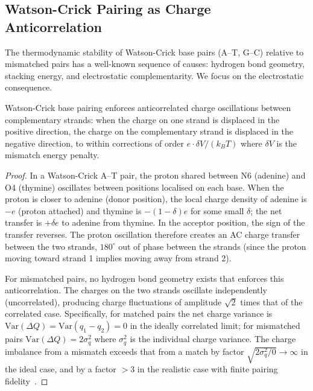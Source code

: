 \subsection{Watson-Crick Pairing as Charge Anticorrelation}

The thermodynamic stability of Watson-Crick base pairs (A--T, G--C) relative to mismatched pairs has a well-known sequence of causes: hydrogen bond geometry, stacking energy, and electrostatic complementarity. We focus on the electrostatic consequence.

\begin{theorem}
Watson-Crick base pairing enforces anticorrelated charge oscillations between complementary strands: when the charge on one strand is displaced in the positive direction, the charge on the complementary strand is displaced in the negative direction, to within corrections of order $e \cdot \delta V / (k_B T)$ where $\delta V$ is the mismatch energy penalty.
\label{v:thm:charge_balance}
\end{theorem}

\begin{proof}
In a Watson-Crick A--T pair, the proton shared between N6 (adenine) and O4 (thymine) oscillates between positions localised on each base. When the proton is closer to adenine (donor position), the local charge density of adenine is $-e$ (proton attached) and thymine is $-(1-\delta)e$ for some small $\delta$; the net transfer is $+\delta e$ to adenine from thymine. In the acceptor position, the sign of the transfer reverses. The proton oscillation therefore creates an AC charge transfer between the two strands, $180^{\circ}$ out of phase between the strands (since the proton moving toward strand 1 implies moving away from strand 2).

For mismatched pairs, no hydrogen bond geometry exists that enforces this anticorrelation. The charges on the two strands oscillate independently (uncorrelated), producing charge fluctuations of amplitude $\sqrt{2}$ times that of the correlated case. Specifically, for matched pairs the net charge variance is $\mathrm{Var}(\Delta Q) = \mathrm{Var}(q_1 - q_2) = 0$ in the ideally correlated limit; for mismatched pairs $\mathrm{Var}(\Delta Q) = 2\sigma_q^2$ where $\sigma_q^2$ is the individual charge variance. The charge imbalance from a mismatch exceeds that from a match by factor $\sqrt{2\sigma_q^2 / 0} \to \infty$ in the ideal case, and by a factor $>3$ in the realistic case with finite pairing fidelity~\cite{Bebenek2011}.
\end{proof}

